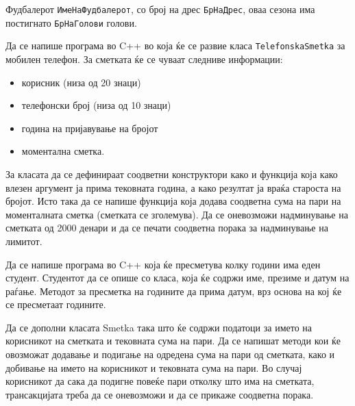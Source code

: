 \documentclass[12pt,a4paper]{exam}
\begin{document}
\begin{questions}
Фудбалерот \texttt{ИмеНаФудбалерот}, со број на дрес \texttt{БрНаДрес}, оваа
сезона има постигнато \texttt{БрНаГолови} голови.

\question
Да се напише програма во C++ во која ќе се развие класа \texttt{TelefonskaSmetka} за
мобилен телефон. За сметката ќе се чуваат следниве информации:
\begin{itemize}
  \item корисник (низа од 20 знаци)
  \item телефонски број (низа од 10 знаци)
  \item година на пријавување на бројот
  \item моментална сметка.
\end{itemize}
За класата да се дефинираат соодветни конструктори како и функција која како
влезен аргумент ја прима тековната година, а како резултат ја враќа староста на
бројот. Исто така да се напише функција која додава соодветна сума на пари на
моменталната сметка (сметката се зголемува). Да се оневозможи надминување на
сметката од 2000 денари и да се печати соодветна порака за надминување на
лимитот.

\question
Да се напише програма во C++ која ќе пресметува колку години има еден студент.
Студентот да се опише со класа, која ќе содржи име, презиме и датум на раѓање. Методот
за пресметка на годините да прима датум, врз основа на кој ќе се пресметаат годините.

\question
Да се дополни класата Smetka така што ќе содржи податоци за името на корисникот на
сметката и тековната сума на пари. Да се напишат методи кои ќе овозможат додавање и
подигање на одредена сума на пари од сметката, како и добивање на името на
корисникот и тековната сума на пари. Во случај корисникот да сака да подигне повеќе
пари отколку што има на сметката, трансакцијата треба да се оневозможи и да се
прикаже соодветна порака.


\end{questions}
\end{document}
